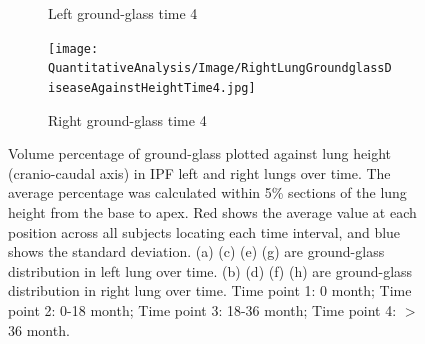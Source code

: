 \begin{figure}[H]
\begin{subfigure}{.41\linewidth}
  \caption{Left ground-glass time 4}
  \label{fig:DiseaseAgainstHeightOverTime1-g} 
\end{subfigure} 
\begin{subfigure}{.41\linewidth}%
  \texttt{[image: QuantitativeAnalysis/Image/RightLungGroundglassDiseaseAgainstHeightTime4.jpg]}
  \caption{Right ground-glass time 4}
  \label{fig:DiseaseAgainstHeightOverTime1-h}
\end{subfigure}
\caption{Volume percentage of ground-glass plotted against lung height (cranio-caudal axis) in IPF left and right lungs over time. The average percentage was calculated within 5\% sections of the lung height from the base to apex. Red shows the average value at each position across all subjects locating each time interval, and blue shows the standard deviation. (a) (c) (e) (g) are ground-glass distribution in left lung over time. (b) (d) (f) (h) are ground-glass distribution in right lung over time. Time point 1: 0 month; Time point 2: 0-18 month; Time point 3: 18-36 month; Time point 4: $>$ 36 month.}
\label{fig:DiseaseAgainstHeightOverTime1}
\end{figure}

